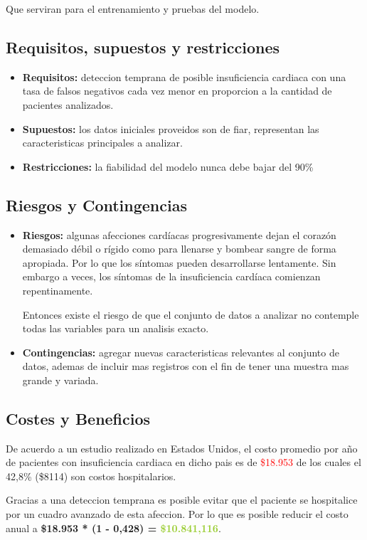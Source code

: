 \documentclass[12pt, letterpaper, spanish]{article}
\begin{document}
Que serviran para el entrenamiento y pruebas del modelo.
\subsection{Requisitos, supuestos y restricciones}
\begin{itemize}
  \item{\textbf{Requisitos: }deteccion temprana de posible insuficiencia cardiaca
  con una tasa de falsos negativos cada vez menor en proporcion a la
  cantidad de pacientes analizados.} 
  \item{\textbf{Supuestos: }los datos iniciales proveidos son de fiar, representan
  las caracteristicas principales a analizar.}
  \item{\textbf{Restricciones: }la fiabilidad del modelo nunca debe bajar del 90\%}
\end{itemize}
\subsection{Riesgos y Contingencias}
\begin{itemize}
  \item{\textbf{Riesgos: }algunas afecciones cardíacas progresivamente dejan 
  el corazón demasiado débil o rígido como para llenarse y bombear sangre de forma apropiada. 
  Por lo que los síntomas pueden desarrollarse lentamente. Sin embargo a veces, 
  los síntomas de la insuficiencia cardíaca comienzan repentinamente.
  
  Entonces existe el riesgo de que el conjunto de datos a analizar no contemple todas
  las variables para un analisis exacto.} 
  \item{\textbf{Contingencias: }agregar nuevas caracteristicas relevantes al conjunto de datos,
  ademas de incluir mas registros con el fin de tener una muestra mas grande y variada.}
\end{itemize}
\subsection{Costes y Beneficios}
De acuerdo a un estudio realizado en Estados Unidos, el costo promedio por año de pacientes
con insuficiencia cardiaca en dicho pais es de \textcolor{red}{\$18.953} de los cuales el 
42,8\% (\$8114) son costos hospitalarios.

Gracias a una deteccion temprana es posible evitar que el paciente se hospitalice por 
un cuadro avanzado de esta afeccion. Por lo que es posible reducir el costo anual a 
\textbf{\$18.953 * (1 - 0,428) = \textcolor{YellowGreen}{\$10.841,116}}.
\end{document}
